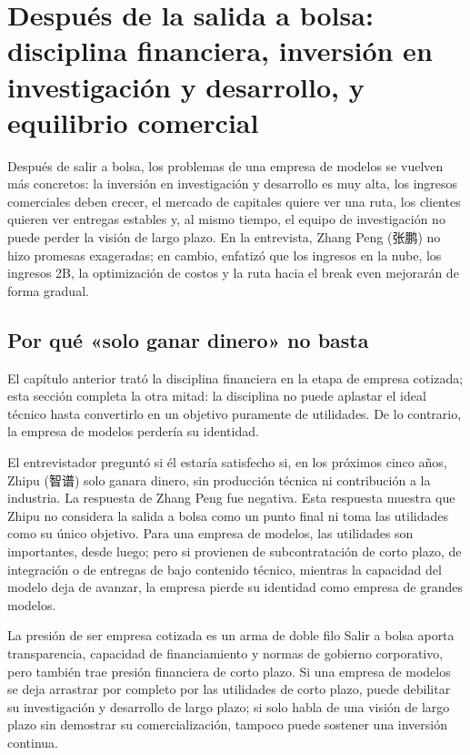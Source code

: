 \section{Después de la salida a bolsa: disciplina financiera, inversión en investigación y desarrollo, y equilibrio comercial}

Después de salir a bolsa, los problemas de una empresa de modelos se vuelven más concretos: la inversión en investigación y desarrollo es muy alta, los ingresos comerciales deben crecer, el mercado de capitales quiere ver una ruta, los clientes quieren ver entregas estables y, al mismo tiempo, el equipo de investigación no puede perder la visión de largo plazo. En la entrevista, Zhang Peng (张鹏) no hizo promesas exageradas; en cambio, enfatizó que los ingresos en la nube, los ingresos 2B, la optimización de costos y la ruta hacia el break even mejorarán de forma gradual.

\subsection{Por qué «solo ganar dinero» no basta}

El capítulo anterior trató la disciplina financiera en la etapa de empresa cotizada; esta sección completa la otra mitad: la disciplina no puede aplastar el ideal técnico hasta convertirlo en un objetivo puramente de utilidades. De lo contrario, la empresa de modelos perdería su identidad.

El entrevistador preguntó si él estaría satisfecho si, en los próximos cinco años, Zhipu (智谱) solo ganara dinero, sin producción técnica ni contribución a la industria. La respuesta de Zhang Peng fue negativa. Esta respuesta muestra que Zhipu no considera la salida a bolsa como un punto final ni toma las utilidades como su único objetivo. Para una empresa de modelos, las utilidades son importantes, desde luego; pero si provienen de subcontratación de corto plazo, de integración o de entregas de bajo contenido técnico, mientras la capacidad del modelo deja de avanzar, la empresa pierde su identidad como empresa de grandes modelos.

\begin{warningbox}{La presión de ser empresa cotizada es un arma de doble filo}
Salir a bolsa aporta transparencia, capacidad de financiamiento y normas de gobierno corporativo, pero también trae presión financiera de corto plazo. Si una empresa de modelos se deja arrastrar por completo por las utilidades de corto plazo, puede debilitar su investigación y desarrollo de largo plazo; si solo habla de una visión de largo plazo sin demostrar su comercialización, tampoco puede sostener una inversión continua.
\end{warningbox}

